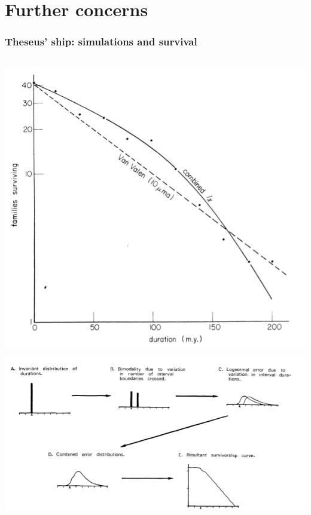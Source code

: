 \documentclass{beamer}
\begin{document}
\appendix
\section{Further concerns}

\begin{frame}
  \frametitle{Theseus' ship: simulations and survival}

  \begin{columns}
    \begin{column}{0.5\textwidth}
      \begin{center}
        \includegraphics[height = 0.4\textheight, width = \textwidth, keepaspectratio = true]{figure/raup}

        \tiny{}

        \includegraphics[height = 0.4\textheight, width = \textwidth, keepaspectratio = true]{figure/sepkoski}


\end{center}
\end{column}
\end{columns}
\end{frame}
\end{document}
